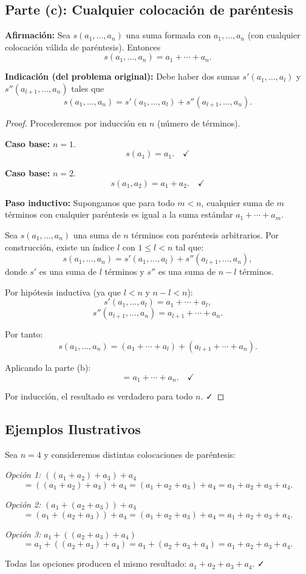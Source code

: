 \subsection*{Parte (c): Cualquier colocación de paréntesis}

\textbf{Afirmación:} Sea $s(a_1, \ldots, a_n)$ una suma formada con $a_1, \ldots, a_n$ (con cualquier colocación válida de paréntesis). Entonces
\[
s(a_1, \ldots, a_n) = a_1 + \cdots + a_n.
\]

\textbf{Indicación (del problema original):} Debe haber dos sumas $s'(a_1, \ldots, a_l)$ y $s''(a_{l+1}, \ldots, a_n)$ tales que
\[
s(a_1, \ldots, a_n) = s'(a_1, \ldots, a_l) + s''(a_{l+1}, \ldots, a_n).
\]

\begin{proof}
Procederemos por inducción en $n$ (número de términos).

\textbf{Caso base: } $n = 1$.
\[
s(a_1) = a_1. \quad \checkmark
\]

\textbf{Caso base: } $n = 2$.
\[
s(a_1, a_2) = a_1 + a_2. \quad \checkmark
\]

\textbf{Paso inductivo:} Supongamos que para todo $m < n$, cualquier suma de $m$ términos con cualquier paréntesis es igual a la suma estándar $a_1 + \cdots + a_m$.

Sea $s(a_1, \ldots, a_n)$ una suma de $n$ términos con paréntesis arbitrarios. Por construcción, existe un índice $l$ con $1 \leq l < n$ tal que:
\[
s(a_1, \ldots, a_n) = s'(a_1, \ldots, a_l) + s''(a_{l+1}, \ldots, a_n),
\]
donde $s'$ es una suma de $l$ términos y $s''$ es una suma de $n - l$ términos.

Por hipótesis inductiva (ya que $l < n$ y $n - l < n$):
\[
s'(a_1, \ldots, a_l) = a_1 + \cdots + a_l,
\]
\[
s''(a_{l+1}, \ldots, a_n) = a_{l+1} + \cdots + a_n.
\]

Por tanto:
\[
s(a_1, \ldots, a_n) = (a_1 + \cdots + a_l) + (a_{l+1} + \cdots + a_n).
\]

Aplicando la parte (b):
\[
= a_1 + \cdots + a_n. \quad \checkmark
\]

Por inducción, el resultado es verdadero para todo $n$. ✓
\end{proof}

\subsection*{Ejemplos Ilustrativos}

\begin{ejemplo}
Sea $n = 4$ y consideremos distintas colocaciones de paréntesis:

\textit{Opción 1:} $((a_1 + a_2) + a_3) + a_4$
\[
= ((a_1 + a_2) + a_3) + a_4 = (a_1 + a_2 + a_3) + a_4 = a_1 + a_2 + a_3 + a_4.
\]

\textit{Opción 2:} $(a_1 + (a_2 + a_3)) + a_4$
\[
= (a_1 + (a_2 + a_3)) + a_4 = (a_1 + a_2 + a_3) + a_4 = a_1 + a_2 + a_3 + a_4.
\]

\textit{Opción 3:} $a_1 + ((a_2 + a_3) + a_4)$
\[
= a_1 + ((a_2 + a_3) + a_4) = a_1 + (a_2 + a_3 + a_4) = a_1 + a_2 + a_3 + a_4.
\]

Todas las opciones producen el mismo resultado: $a_1 + a_2 + a_3 + a_4$. ✓
\end{ejemplo}

